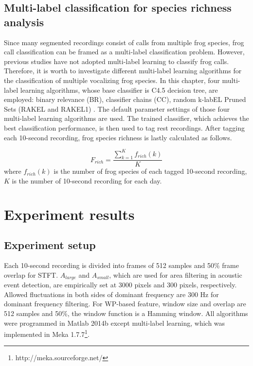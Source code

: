 \subsection{Multi-label classification for species richness analysis} 
Since many segmented recordings consist of calls from multiple frog species, frog call classification can be framed as a multi-label classification problem. However, previous studies have not adopted multi-label learning to classify frog calls. Therefore, it is worth to investigate different multi-label learning algorithms for the classification of multiple vocalizing frog species. In this chapter, four multi-label learning algorithms, whose base classifier is C4.5 decision tree, are employed: binary relevance (BR), classifier chains (CC), random k-labEL Pruned Sets (RAKEL and RAKEL1) \cite{ZhangReview2014}. The default parameter settings of those four multi-label learning algorithms are used. The trained classifier, which achieves the best classification performance, is then used to tag rest recordings. After tagging each 10-second recording, frog species richness is lastly calculated as follows.

\begin{equation}
F_{rich} = \frac{\sum_{k=1}^{K}f_{rich}(k)}{K}
\end{equation} 
where $f_{rich}(k)$ is the number of frog species of each tagged 10-second recording, $K$ is the number of 10-second recording for each day.




\section{Experiment results}



\subsection{Experiment setup}
Each 10-second recording is divided into frames of 512 samples and 50\% frame overlap for STFT. $A_{large}$ and $A_{small}$, which are used for area filtering in acoustic event detection, are empirically set at 3000 pixels and 300 pixels, respectively. Allowed fluctuations in both sides of dominant frequency are 300 Hz for dominant frequency filtering. For WP-based feature, window size and overlap are 512 samples and 50\%, the window function is a Hamming window. All algorithms were programmed in Matlab 2014b except multi-label learning, which was implemented in Meka 1.7.7\footnote[4]{http://meka.sourceforge.net/}. 





